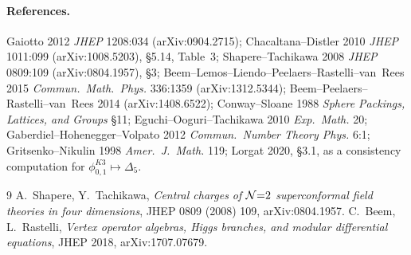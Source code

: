 \paragraph*{References.}
Gaiotto 2012 \emph{JHEP} 1208:034 (arXiv:0904.2715);
Chacaltana--Distler 2010 \emph{JHEP} 1011:099 (arXiv:1008.5203),
\S5.14, Table~3;
Shapere--Tachikawa 2008 \emph{JHEP} 0809:109 (arXiv:0804.1957), \S3;
Beem--Lemos--Liendo--Peelaers--Rastelli--van~Rees 2015
\emph{Commun.\ Math.\ Phys.} 336:1359 (arXiv:1312.5344);
Beem--Peelaers--Rastelli--van~Rees 2014 (arXiv:1408.6522);
Conway--Sloane 1988 \emph{Sphere Packings, Lattices, and Groups} \S11;
Eguchi--Ooguri--Tachikawa 2010 \emph{Exp.\ Math.} 20;
Gaberdiel--Hohenegger--Volpato 2012 \emph{Commun.\ Number Theory Phys.}
6:1;
Gritsenko--Nikulin 1998 \emph{Amer.\ J.\ Math.} 119;
Lorgat 2020, \S3.1, as a consistency computation for
$\phi^{K3}_{0,1}\mapsto\Delta_5$.

\begin{thebibliography}{9}
 A.\ Shapere, Y.\ Tachikawa,
  \emph{Central charges of $\mathcal{N}{=}2$ superconformal field theories in four
  dimensions}, JHEP 0809 (2008) 109, arXiv:0804.1957.
 C.\ Beem, L.\ Rastelli, \emph{Vertex
  operator algebras, Higgs branches, and modular differential
  equations}, JHEP 2018, arXiv:1707.07679.
\end{thebibliography}
